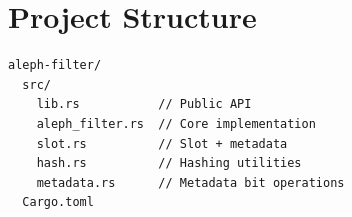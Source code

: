\section{Project Structure}


\begin{lstlisting}[caption={Crate structure}]
aleph-filter/
  src/
    lib.rs           // Public API
    aleph_filter.rs  // Core implementation
    slot.rs          // Slot + metadata
    hash.rs          // Hashing utilities
    metadata.rs      // Metadata bit operations
  Cargo.toml
\end{lstlisting}


